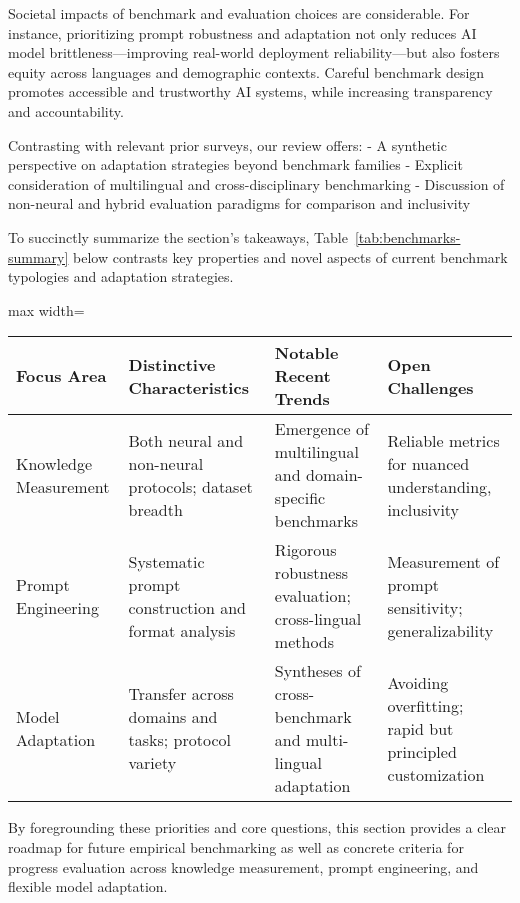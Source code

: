 \documentclass[sigconf]{acmart}
\begin{document}
Societal impacts of benchmark and evaluation choices are considerable. For instance, prioritizing prompt robustness and adaptation not only reduces AI model brittleness—improving real-world deployment reliability—but also fosters equity across languages and demographic contexts. Careful benchmark design promotes accessible and trustworthy AI systems, while increasing transparency and accountability.

Contrasting with relevant prior surveys, our review offers:
- A synthetic perspective on adaptation strategies beyond benchmark families
- Explicit consideration of multilingual and cross-disciplinary benchmarking
- Discussion of non-neural and hybrid evaluation paradigms for comparison and inclusivity

To succinctly summarize the section's takeaways, Table~\ref{tab:benchmarks-summary} below contrasts key properties and novel aspects of current benchmark typologies and adaptation strategies.

\begin{table*}[htbp]
\centering
\caption{Summary of Key Benchmarks, Prompt Techniques, and Adaptation Strategies}
\label{tab:benchmarks-summary}
\begin{adjustbox}{max width=\textwidth}
\begin{tabular}{@{}llll@{}}
\toprule
Focus Area         & Distinctive Characteristics               & Notable Recent Trends                          & Open Challenges\\
\midrule
Knowledge Measurement & Both neural and non-neural protocols; dataset breadth & Emergence of multilingual and domain-specific benchmarks & Reliable metrics for nuanced understanding, inclusivity \\
Prompt Engineering     & Systematic prompt construction and format analysis    & Rigorous robustness evaluation; cross-lingual methods     & Measurement of prompt sensitivity; generalizability\\
Model Adaptation       & Transfer across domains and tasks; protocol variety   & Syntheses of cross-benchmark and multi-lingual adaptation & Avoiding overfitting; rapid but principled customization\\
\bottomrule
\end{tabular}
\end{adjustbox}
\end{table*}

By foregrounding these priorities and core questions, this section provides a clear roadmap for future empirical benchmarking as well as concrete criteria for progress evaluation across knowledge measurement, prompt engineering, and flexible model adaptation.
\end{document}
